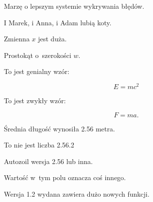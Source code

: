 \documentclass{article}
\begin{document}
Marzę o lepszym systemie wykrywania błędów.

I Marek, i  Anna, i
Adam lubią koty.

Zmienna $x$ jest duża. %

Prostokąt o~szerokości $w$.

To jest genialny wzór:

\[ E = mc^2 \]

To jest zwykły wzór:

\[ F = ma. \]

Średnia długość wynosiła 2.56 metra.

To nie jest liczba 2.56.2

Autozoil wersja 2.56 lub inna.

Wartość  w~tym polu oznacza coś innego.

Wersja 1.2 wydana zawiera dużo nowych funkcji.
\end{document}
